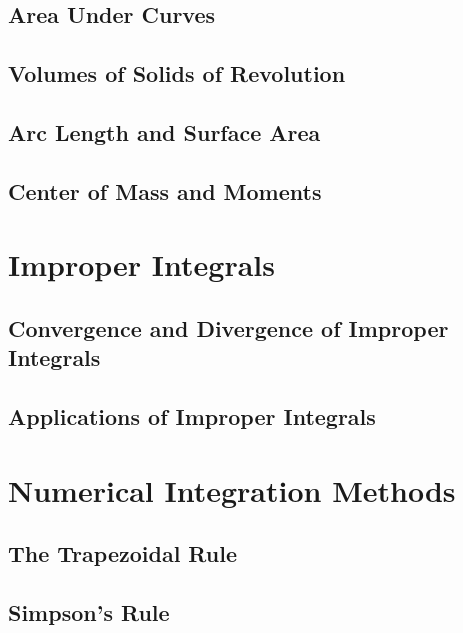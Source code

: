     \subsection{Area Under Curves}
    \subsection{Volumes of Solids of Revolution}
    \subsection{Arc Length and Surface Area}
    \subsection{Center of Mass and Moments}

\section{Improper Integrals}
    \subsection{Convergence and Divergence of Improper Integrals}
    \subsection{Applications of Improper Integrals}

\section{Numerical Integration Methods}
    \subsection{The Trapezoidal Rule}
    \subsection{Simpson's Rule}